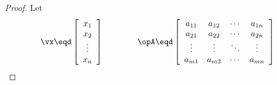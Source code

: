 \begin{theorem}
\label{thm:mc_Axx}
\end{theorem}
\begin{proof}
Let
\[
   \vx \eqd
   \left[
      \begin{array}{c}
         x_1 \\
         x_2 \\
         \vdots \\
         x_n
      \end{array}
   \right]
   \qquad\qquad
   \opA \eqd
   \left[\begin{array}{ccccc}
     a_{11}   & a_{12}   & \cdots & a_{1n}   \\
     a_{21}   & a_{22}   & \cdots & a_{2n}   \\
     \vdots   & \vdots   & \ddots & \vdots \\
     a_{m1}   & a_{m2}   & \cdots & a_{mn}
   \end{array}\right]
\]


\end{proof}
